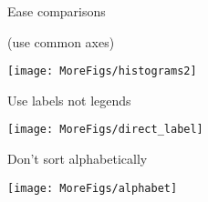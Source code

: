 \documentclass[12pt]{article}\usepackage[]{graphicx}\usepackage[]{color}
\makeatletter
\def\maxwidth{ %
  \ifdim\Gin@nat@width>\linewidth
    \linewidth
  \else
    \Gin@nat@width
  \fi
}
\newenvironment{knitrout}{}{} %
\newcommand{\headsize}{\fontsize{35}{35} \selectfont}
\newcommand{\smallersize}{\fontsize{20}{25} \selectfont}
\makeatother
\begin{document}
\newpage


\headsize \color{myyellow}
\hfill
\begin{minipage}{6.25in}
\centering
Ease comparisons

\bigskip

\color{myblue} \smallersize
(use common axes)
\end{minipage}

\vfill

\begin{knitrout}
\color{fgcolor}

{\centering \texttt{[image: MoreFigs/histograms2]} 

}



\end{knitrout}



\newpage


\headsize \color{myyellow}
\hfill
\begin{minipage}{6.25in}
\centering
Use labels not legends
\end{minipage}

\vfill

\begin{knitrout}
\color{fgcolor}

{\centering \texttt{[image: MoreFigs/direct\_label]} 

}



\end{knitrout}







\newpage


\headsize \color{myyellow}
\hfill
\begin{minipage}{6.25in}
\centering
Don't sort alphabetically
\end{minipage}

\vfill

\begin{knitrout}
\color{fgcolor}

{\centering \texttt{[image: MoreFigs/alphabet]} 

}



\end{knitrout}
\end{document}
